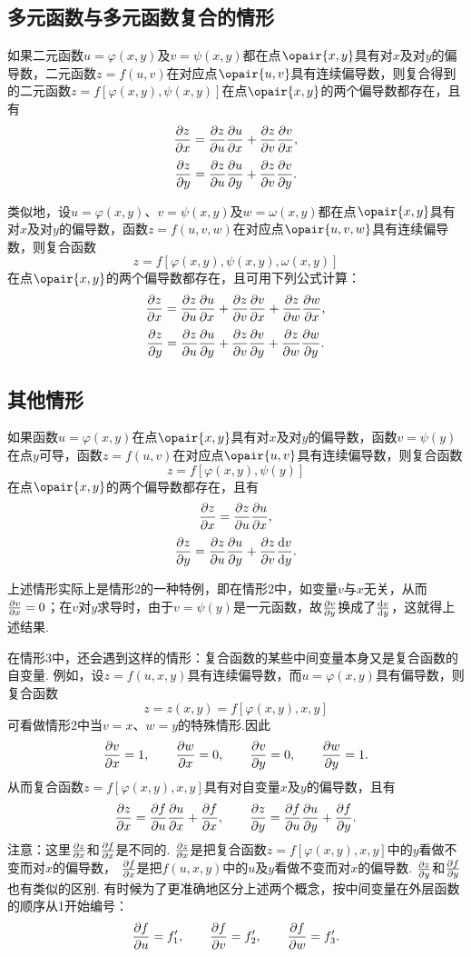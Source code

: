 \subsection{多元函数与多元函数复合的情形}
\begin{theorem}
如果二元函数\(u=\varphi(x,y)\)及\(v=\psi(x,y)\)都在点\(\opair{x,y}\)具有对\(x\)及对\(y\)的偏导数，二元函数\(z=f(u,v)\)在对应点\(\opair{u,v}\)具有连续偏导数，则复合得到的二元函数\(z=f[\varphi(x,y),\psi(x,y)]\)在点\(\opair{x,y}\)的两个偏导数都存在，且有\[
\pdv{z}{x} = \pdv{z}{u}\pdv{u}{x} + \pdv{z}{v}\pdv{v}{x},
\]\[
\pdv{z}{y} = \pdv{z}{u}\pdv{u}{y} + \pdv{z}{v}\pdv{v}{y}.
\]
\end{theorem}
类似地，设\(u=\varphi(x,y)\)、\(v=\psi(x,y)\)及\(w=\omega(x,y)\)都在点\(\opair{x,y}\)具有对\(x\)及对\(y\)的偏导数，函数\(z=f(u,v,w)\)在对应点\(\opair{u,v,w}\)具有连续偏导数，则复合函数\[
z = f[\varphi(x,y),\psi(x,y),\omega(x,y)]
\]在点\(\opair{x,y}\)的两个偏导数都存在，且可用下列公式计算：\[
\pdv{z}{x} = \pdv{z}{u}\pdv{u}{x} + \pdv{z}{v}\pdv{v}{x} + \pdv{z}{w}\pdv{w}{x},
\]\[
\pdv{z}{y} = \pdv{z}{u}\pdv{u}{y} + \pdv{z}{v}\pdv{v}{y} + \pdv{z}{w}\pdv{w}{y}.
\]

\subsection{其他情形}
\begin{theorem}
如果函数\(u=\varphi(x,y)\)在点\(\opair{x,y}\)具有对\(x\)及对\(y\)的偏导数，函数\(v=\psi(y)\)在点\(y\)可导，函数\(z=f(u,v)\)在对应点\(\opair{u,v}\)具有连续偏导数，则复合函数\[
z = f[\varphi(x,y),\psi(y)]
\]在点\(\opair{x,y}\)的两个偏导数都存在，且有\[
\pdv{z}{x} = \pdv{z}{u} \pdv{u}{x},
\]\[
\pdv{z}{y} = \pdv{z}{u} \pdv{u}{y} + \pdv{z}{v} \dv{v}{y}.
\]
\end{theorem}
上述情形实际上是情形2的一种特例，即在情形2中，如变量\(v\)与\(x\)无关，从而\(\pdv{v}{x}=0\)；在\(v\)对\(y\)求导时，由于\(v=\psi(y)\)是一元函数，故\(\pdv{v}{y}\)换成了\(\dv{v}{y}\)，这就得上述结果.

在情形3中，还会遇到这样的情形：复合函数的某些中间变量本身又是复合函数的自变量.
例如，设\(z = f(u,x,y)\)具有连续偏导数，而\(u=\varphi(x,y)\)具有偏导数，则复合函数\[
z = z(x,y) = f[\varphi(x,y),x,y]
\]可看做情形2中当\(v=x\)、\(w=y\)的特殊情形.因此\[
\pdv{v}{x} = 1, \qquad \pdv{w}{x} = 0,
\qquad
\pdv{v}{y} = 0, \qquad \pdv{w}{y} = 1.
\]从而复合函数\(z = f[\varphi(x,y),x,y]\)具有对自变量\(x\)及\(y\)的偏导数，且有\[
\pdv{z}{x} = \pdv{f}{u} \pdv{u}{x} + \pdv{f}{x},
\qquad
\pdv{z}{y} = \pdv{f}{u} \pdv{u}{y} + \pdv{f}{y}.
\]
注意：这里\(\pdv{z}{x}\)和\(\pdv{f}{x}\)是不同的.
\(\pdv{z}{x}\)是把复合函数\(z = f[\varphi(x,y),x,y]\)中的\(y\)看做不变而对\(x\)的偏导数，
\(\pdv{f}{x}\)是把\(f(u,x,y)\)中的\(u\)及\(y\)看做不变而对\(x\)的偏导数.
\(\pdv{z}{y}\)和\(\pdv{f}{y}\)也有类似的区别.
有时候为了更准确地区分上述两个概念，按中间变量在外层函数的顺序从1开始编号：\[
\pdv{f}{u} = f_1', \qquad
\pdv{f}{v} = f_2', \qquad
\pdv{f}{w} = f_3'.
\]

